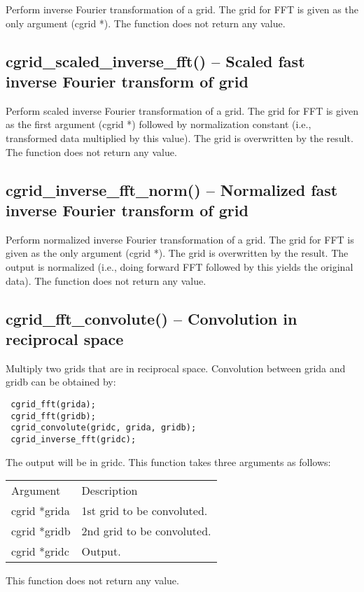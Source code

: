 \documentclass[12pt,letterpaper]{report}
\begin{document}
Perform inverse Fourier transformation of a grid. The grid for FFT is given as the only argument (cgrid *). The function does not return any value.

\subsection{cgrid\_scaled\_inverse\_fft() -- Scaled fast inverse Fourier transform of grid}

Perform scaled inverse Fourier transformation of a grid. The grid for FFT is given as the first argument (cgrid *) followed by normalization constant (i.e., transformed data multiplied by this value). The grid is overwritten by the result. The function does not return any value.

\subsection{cgrid\_inverse\_fft\_norm() -- Normalized fast inverse Fourier transform of grid}

Perform normalized inverse Fourier transformation of a grid. The grid for FFT is given as the only argument (cgrid *). The grid is overwritten by the result. The output is normalized (i.e., doing forward FFT followed by this yields the original data). The function does not return any value.

\subsection{cgrid\_fft\_convolute() -- Convolution in reciprocal space}

Multiply two grids that are in reciprocal space. Convolution between grida and gridb can be obtained by:
\begin{verbatim}
 cgrid_fft(grida);
 cgrid_fft(gridb);
 cgrid_convolute(gridc, grida, gridb);
 cgrid_inverse_fft(gridc);
\end{verbatim}
The output will be in gridc. This function takes three arguments as follows:
\begin{longtable}{p{} p{}}
Argument & Description\\
\cline{1-2}
cgrid *grida & 1st grid to be convoluted.\\ 
cgrid *gridb & 2nd grid to be convoluted.\\
cgrid *gridc & Output.\\
\end{longtable}
\noindent
This function does not return any value.
\end{document}
